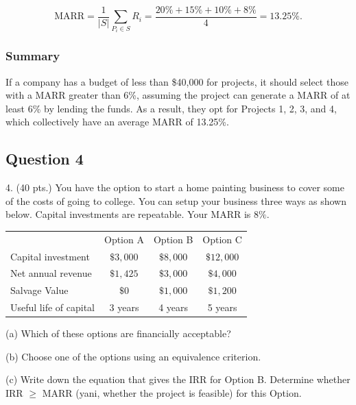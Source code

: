 \documentclass[12pt]{article}
\begin{document}
\[
\text{MARR} = \frac{1}{|S|} \sum_{P_i \in S} R_i = \frac{20\% + 15\% + 10\% + 8\%}{4} = \boxed{13.25\%}.
\]


\subsubsection*{Summary}
If a company has a budget of less than \$40,000 for projects, it should select those with a MARR greater than 6\%, assuming the project can generate a MARR of at least 6\% by lending the funds. As a result, they opt for Projects 1, 2, 3, and 4, which collectively have an average MARR of 13.25\%.









 
\newpage
\subsection*{Question 4}
\begin{q}
4. (40 pts.) You have the option to start a home painting business to cover some of the costs of going to college. You can setup your business three ways as shown below. Capital investments are repeatable. Your MARR is \(8 \%\).
\begin{center}
\begin{tabular}{lccc} 
& Option A & Option B & Option C \\
Capital investment & \(\$ 3,000\) & \(\$ 8,000\) & \(\$ 12,000\) \\
Net annual revenue & \(\$ 1,425\) & \(\$ 3,000\) & \(\$ 4,000\) \\
Salvage Value & \(\$ 0\) & \(\$ 1,000\) & \(\$ 1,200\) \\
Useful life of capital & 3 years & 4 years & 5 years
\end{tabular}
\end{center}

(a) Which of these options are financially acceptable?

(b) Choose one of the options using an equivalence criterion.

(c) Write down the equation that gives the IRR for Option B. Determine whether IRR \(\geq\) MARR (yani, whether the project is feasible) for this Option.
\end{q}
\end{document}
